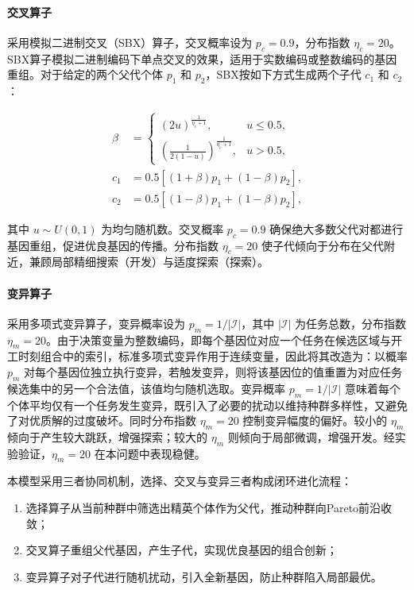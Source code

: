 \documentclass[UTF8,a4paper,zihao=-4]{ctexart}
\begin{document}
\paragraph{交叉算子}
采用模拟二进制交叉（SBX）算子，交叉概率设为 $p_c = 0.9$，分布指数 $\eta_c = 20$。SBX算子模拟二进制编码下单点交叉的效果，适用于实数编码或整数编码的基因重组。对于给定的两个父代个体 $p_1$ 和 $p_2$，SBX按如下方式生成两个子代 $c_1$ 和 $c_2$：

\[
\begin{aligned}
\beta &= \begin{cases}
(2u)^{\frac{1}{\eta_c+1}}, & u \leq 0.5,\\
\left(\frac{1}{2(1-u)}\right)^{\frac{1}{\eta_c+1}}, & u > 0.5,
\end{cases}\\
c_1 &= 0.5\left[(1+\beta)p_1 + (1-\beta)p_2\right],\\
c_2 &= 0.5\left[(1-\beta)p_1 + (1-\beta)p_2\right],
\end{aligned}
\]

其中 $u \sim U(0,1)$ 为均匀随机数。交叉概率 $p_c=0.9$ 确保绝大多数父代对都进行基因重组，促进优良基因的传播。分布指数 $\eta_c=20$ 使子代倾向于分布在父代附近，兼顾局部精细搜索（开发）与适度探索（探索）。

\paragraph{变异算子}
采用多项式变异算子，变异概率设为 $p_m = 1 / |\mathcal{I}|$，其中 $|\mathcal{I}|$ 为任务总数，分布指数 $\eta_m = 20$。由于决策变量为整数编码，即每个基因位对应一个任务在候选区域与开工时刻组合中的索引，标准多项式变异作用于连续变量，因此将其改造为：以概率 $p_m$ 对每个基因位独立执行变异，若触发变异，则将该基因位的值重置为对应任务候选集中的另一个合法值，该值均匀随机选取。变异概率 $p_m = 1/|\mathcal{I}|$ 意味着每个个体平均仅有一个任务发生变异，既引入了必要的扰动以维持种群多样性，又避免了对优质解的过度破坏。同时分布指数 $\eta_m=20$ 控制变异幅度的偏好。较小的 $\eta_m$ 倾向于产生较大跳跃，增强探索；较大的 $\eta_m$ 则倾向于局部微调，增强开发。经实验验证，$\eta_m=20$ 在本问题中表现稳健。

本模型采用三者协同机制，选择、交叉与变异三者构成闭环进化流程：
\begin{enumerate}
    \item 选择算子从当前种群中筛选出精英个体作为父代，推动种群向Pareto前沿收敛；
    \item 交叉算子重组父代基因，产生子代，实现优良基因的组合创新；
    \item 变异算子对子代进行随机扰动，引入全新基因，防止种群陷入局部最优。
\end{enumerate}
\end{document}
